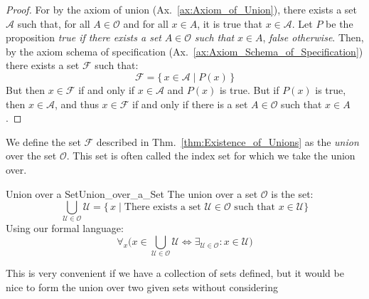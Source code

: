         \begin{proof}
            For by the axiom of union (Ax.~\ref{ax:Axiom_of_Union}), there
            exists a set $\mathcal{A}$ such that, for all $A\in\mathcal{O}$
            and for all $x\in{A}$, it is true that $x\in\mathcal{A}$. Let
            $P$ be the proposition \textit{true if there exists a set}
            $A\in\mathcal{O}$ \textit{such that} $x\in{A}$,
            \textit{false otherwise}. Then, by the axiom schema of specification
            (Ax.~\ref{ax:Axiom_Schema_of_Specification}) there exists a set
            $\mathcal{F}$ such that:
            \begin{equation}
                \mathcal{F}=\big\{\,x\in\mathcal{A}\;|\;P(x)\,\big\}
            \end{equation}
            But then $x\in\mathcal{F}$ if and only if $x\in\mathcal{A}$ and
            $P(x)$ is true. But if $P(x)$ is true, then $x\in\mathcal{A}$, and
            thus $x\in\mathcal{F}$ if and only if there is a set
            $A\in\mathcal{O}$ such that $x\in{A}$.
        \end{proof}
        We define the set $\mathcal{F}$ described in
        Thm.~\ref{thm:Existence_of_Unions} as the \textit{union}%
         over the set $\mathcal{O}$. This set is often
        called the index set for which we take the union over.
        \begin{fdefinition}{Union over a Set}{Union_over_a_Set}
            The \gls{union over a set} $\mathcal{O}$ is the set:
            \begin{equation*}
                \bigcup_{\mathcal{U}\in\mathcal{O}}\mathcal{U}
                =\big\{\,x\;|\;\textrm{There exists a set }
                         \mathcal{U}\in\mathcal{O}\textrm{ such that }
                         x\in\mathcal{U}\big\}
            \end{equation*}
            Using our formal language:
            \begin{equation*}
                \forall_{x}\Big(
                    x\in\bigcup_{\mathcal{U}\in\mathcal{O}}\mathcal{U}
                    \Leftrightarrow\exists_{\mathcal{U}\in\mathcal{O}}:
                    x\in\mathcal{U}\Big)
            \end{equation*}
        \end{fdefinition}
        This is very convenient if we have a collection of sets defined, but it
        would be nice to form the union over two given sets without considering

